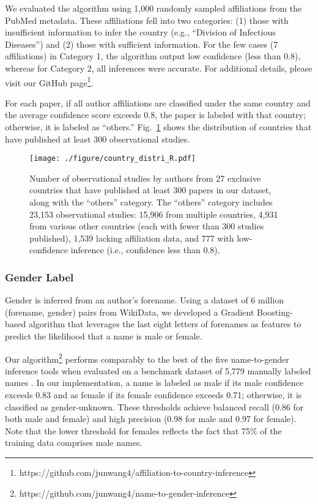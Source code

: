 \begin{appendices}
We evaluated the algorithm using 1,000 randomly sampled affiliations from the
PubMed metadata. These affiliations fell into two categories: (1) those with
insufficient information to infer the country (e.g., “Division of Infectious
Diseases”) and (2) those with sufficient information. For the few cases (7
affiliations) in Category 1, the algorithm output low confidence (less than
0.8), whereas for Category 2, all inferences were accurate. For additional
details, please visit our GitHub
page\footnote{https://github.com/junwang4/affiliation-to-country-inference}.

For each paper, if all author affiliations are classified under the same country
and the average confidence score exceeds 0.8, the paper is labeled with that
country; otherwise, it is labeled as “others.”
Fig.~\ref{fig__country_distribution} shows the distribution of countries that
have published at least 300 observational studies.

\begin{figure}[!ht]
    \texttt{[image: ./figure/country\_distri\_R.pdf]}
        \caption{
        Number of observational studies by authors from 27 exclusive countries that
        have published at least 300 papers in our dataset, along with the “others” category.
        The “others” category includes 23,153 observational studies: 
        15,906 from multiple countries,
         4,931 from various other countries 
         (each with fewer than 300 studies published),
          1,539 lacking affiliation data,
           and 777 with low-confidence inference (i.e., confidence less than 0.8).
        }
        \label{fig__country_distribution}
    \end{figure}


\subsubsection{Gender Label} \label{si_gender}

Gender is inferred from an author's forename. Using a dataset of 6 million
(forename, gender) pairs from WikiData, we developed a Gradient Boosting-based
algorithm that leverages the last eight letters of forenames as features to
predict the likelihood that a name is male or female.

Our algorithm\footnote{https://github.com/junwang4/name-to-gender-inference}
performs comparably to the best of the five name-to-gender inference tools when
evaluated on a benchmark dataset of 5,779 manually labeled names
\citep{Santamara2018ComparisonAB}. In our implementation, a name is labeled as
male if its male confidence exceeds 0.83 and as female if its female confidence
exceeds 0.71; otherwise, it is classified as gender-unknown. These thresholds
achieve balanced recall (0.86 for both male and female) and high precision (0.98
for male and 0.97 for female). Note that the lower threshold for females
reflects the fact that 75\% of the training data comprises male names.


\end{appendices}
